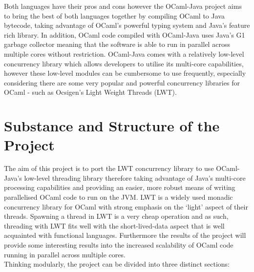 \documentclass[a4paper]{article}
\begin{document}
Both languages have their pros and cons however the OCaml-Java project aims to bring the best of both languages together by compiling OCaml to Java bytecode, taking advantage of OCaml's powerful typing system and Java's feature rich library. In addition, OCaml code compiled with OCaml-Java uses Java's G1 garbage collector meaning that the software is able to run in parallel across multiple cores without restriction. OCaml-Java comes with a relatively low-level concurrency library which allows developers to utilise its multi-core capabilities, however these low-level modules can be cumbersome to use frequently, especially considering there are some very popular and powerful concurrency libraries for OCaml - such as Ocsigen's Light Weight Threads (LWT).

\section{Substance and Structure of the Project}
\label{sec:substance}
The aim of this project is to port the LWT concurrency library to use OCaml-Java's low-level threading library therefore taking advantage of Java's multi-core processing capabilities and providing an easier, more robust means of writing parallelised OCaml code to run on the JVM. LWT is a widely used monadic concurrency library for OCaml with strong emphasis on the `light' aspect of their threads. Spawning a thread in LWT is a very cheap operation and as such, threading with LWT fits well with the short-lived-data aspect that is well acquainted with functional languages. Furthermore the results of the project will provide some interesting results into the increased scalability of OCaml code running in parallel across multiple cores.\\
Thinking modularly, the project can be divided into three distinct sections:
\end{document}
